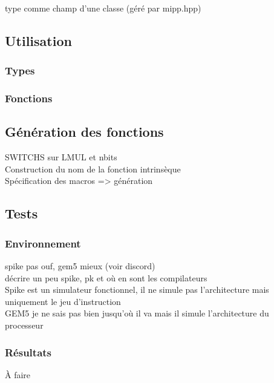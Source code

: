 \documentclass{article}
\begin{document}
   type comme champ d'une classe (géré par mipp.hpp)

\subsection{Utilisation}

   \subsubsection{Types}

      

   \subsubsection{Fonctions}
   
      

\subsection{Génération des fonctions}

   SWITCHS sur LMUL et nbits\\
   Construction du nom de la fonction intrinsèque\\
   Spécification des macros => génération

\subsection{Tests}

   \subsubsection{Environnement}

      spike pas ouf, gem5 mieux (voir discord)\\
      décrire un peu spike, pk et où en sont les compilateurs\\
      Spike est un simulateur fonctionnel, il ne simule pas l'architecture mais uniquement le jeu d'instruction\\
      GEM5 je ne sais pas bien jusqu'où il va mais il simule l'architecture du processeur

   \subsubsection{Résultats}

      À faire
\end{document}
